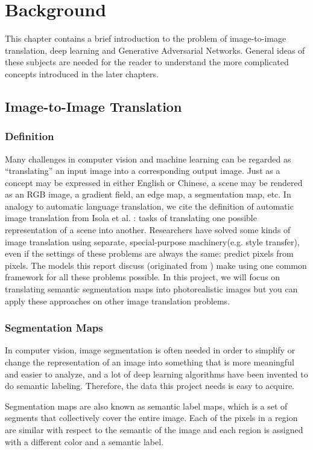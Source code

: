 \chapter{Background}
\label{cha:intro}
This chapter contains a brief introduction to the problem of image-to-image translation,
deep learning and Generative Adversarial Networks. General ideas of these subjects
are needed for the reader to understand the more complicated concepts introduced in the later
chapters.

\section{Image-to-Image Translation}
\subsection{Definition}
Many challenges in computer vision and machine learning can be regarded as “translating” an 
input image into a corresponding output image. Just as a concept may be expressed in either 
English or Chinese, a scene may be rendered as an RGB image, a gradient field, an edge map, 
a segmentation map, etc. In analogy to automatic language translation, we cite the definition
of automatic image translation from Isola et al. \cite{pix2pix2016}: tasks of translating one 
possible representation of a scene into another. Researchers have solved some kinds of image 
translation using separate, special-purpose machinery(e.g. style transfer\cite{gatys2015neural}),
even if the settings of these problems are always the same: predict pixels from pixels.
The models this report discuss (originated from \cite{pix2pix2016})
make using one common framework for all these problems possible.
In this project, we will focus on translating 
semantic segmentation maps into photorealistic images but you can apply these approaches on
other image translation problems.

\subsection{Segmentation Maps}
In computer vision, image segmentation is often needed in order to simplify or change 
the representation of an image into something that is more meaningful and easier to analyze, 
and a lot of deep learning algorithms have been invented to do semantic labeling. Therefore,
the data this project needs is easy to acquire.

Segmentation maps are also known as semantic label maps, which is a set of segments 
that collectively cover the entire image. Each of the pixels in a region are similar 
with respect to the semantic of the image and each region is assigned with a different 
color and a semantic label.


